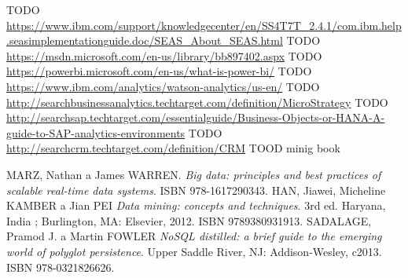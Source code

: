 \begin{thebibliography}{99}
TODO \url{ https://www.ibm.com/support/knowledgecenter/en/SS4T7T_2.4.1/com.ibm.help.seasimplementationguide.doc/SEAS_About_SEAS.html}
TODO \url{https://msdn.microsoft.com/en-us/library/bb897402.aspx}
TODO \url{https://powerbi.microsoft.com/en-us/what-is-power-bi/}
TODO \url{https://www.ibm.com/analytics/watson-analytics/us-en/}
TODO \url{http://searchbusinessanalytics.techtarget.com/definition/MicroStrategy}
TODO \url{http://searchsap.techtarget.com/essentialguide/Business-Objects-or-HANA-A-guide-to-SAP-analytics-environments}
TODO \url{http://searchcrm.techtarget.com/definition/CRM}
TOOD minig book

MARZ, Nathan a James WARREN.
\textit{Big data: principles and best practices of scalable real-time data systems}.
ISBN 978-1617290343.
HAN, Jiawei, Micheline KAMBER a Jian PEI
\textit{Data mining: concepts and techniques}.
3rd ed. Haryana, India ; Burlington, MA: Elsevier, 2012. ISBN 9789380931913.
SADALAGE, Pramod J. a Martin FOWLER
\textit{NoSQL distilled: a brief guide to the emerging world of polyglot persistence}.
Upper Saddle River, NJ: Addison-Wesley, c2013. ISBN 978-0321826626.

\end{thebibliography}
